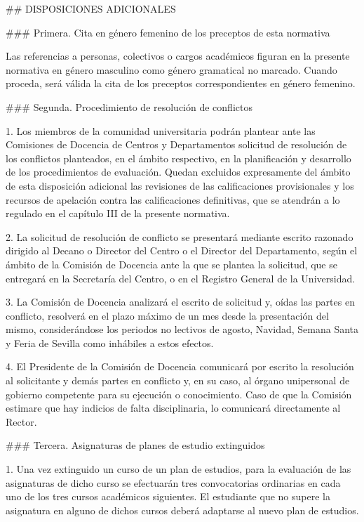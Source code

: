 \documentclass{article}
\begin{document}
\begin{itemize}
\begin{itemize}
\begin{scriptsize}
                  \#\# DISPOSICIONES ADICIONALES

                  \#\#\# Primera. Cita en género femenino de los preceptos de esta normativa

                  Las referencias a personas, colectivos o cargos académicos figuran en la presente normativa en género masculino como género gramatical no marcado. Cuando proceda, será válida la cita de los preceptos correspondientes en género femenino.

                  \#\#\# Segunda. Procedimiento de resolución de conflictos

                  1. Los miembros de la comunidad universitaria podrán plantear ante las Comisiones de Docencia de Centros y Departamentos solicitud de resolución de los conflictos planteados, en el ámbito respectivo, en la planificación y desarrollo de los procedimientos de evaluación. Quedan excluidos expresamente del ámbito de esta disposición adicional las revisiones de las calificaciones provisionales y los recursos de apelación contra las calificaciones definitivas, que se atendrán a lo regulado en el capítulo III de la presente normativa.

                  2. La solicitud de resolución de conflicto se presentará mediante escrito razonado dirigido al Decano o Director del Centro o el Director del Departamento, según el ámbito de la Comisión de Docencia ante la que se plantea la solicitud, que se entregará en la Secretaría del Centro, o en el Registro General de la Universidad.

                  3. La Comisión de Docencia analizará el escrito de solicitud y, oídas las partes en conflicto, resolverá en el plazo máximo de un mes desde la presentación del mismo, considerándose los periodos no lectivos de agosto, Navidad, Semana Santa y Feria de Sevilla como inhábiles a estos efectos.

                  4. El Presidente de la Comisión de Docencia comunicará por escrito la resolución al solicitante y demás partes en conflicto y, en su caso, al órgano unipersonal de gobierno competente para su ejecución o conocimiento. Caso de que la Comisión estimare que hay indicios de falta disciplinaria, lo comunicará directamente al Rector.

                  \#\#\# Tercera. Asignaturas de planes de estudio extinguidos

                  1. Una vez extinguido un curso de un plan de estudios, para la evaluación de las asignaturas de dicho curso se efectuarán tres convocatorias ordinarias en cada uno de los tres cursos académicos siguientes. El estudiante que no supere la asignatura en alguno de dichos cursos deberá adaptarse al nuevo plan de estudios.


\end{scriptsize}
\end{itemize}
\end{itemize}
\end{document}
